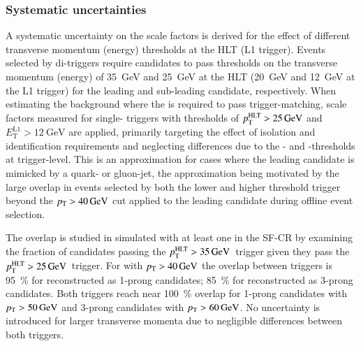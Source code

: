 \subsubsection{Systematic uncertainties}



A systematic uncertainty on the scale factors is derived for the
effect of different \tauhadvis transverse momentum (energy) thresholds
at the HLT (L1 trigger). Events selected by di-\tauhadvis triggers
require \tauhadvis candidates to pass thresholds on the transverse
momentum (energy) of \SI{35}{\GeV} and \SI{25}{\GeV} at the HLT
(\SI{20}{\GeV} and \SI{12}{\GeV} at the L1 trigger) for the leading
and sub-leading \tauhadvis candidate, respectively. When estimating
the \ttbarFakes background where the \faketauhadvis is required to
pass trigger-matching, scale factors measured for single-\tauhadvis
triggers with thresholds of $p_{\text{T}}^{\text{HLT}} > \SI{25}{\ensuremath{\text{GeV}}}$ and
$E_{\text{T}}^{\text{L1}} > \SI{12}{\GeV}$ are applied, primarily
targeting the effect of isolation and identification requirements and
neglecting differences due to the \pT- and \ET-thresholds at
trigger-level. This is an approximation for cases where the leading
\tauhadvis candidate is mimicked by a quark- or gluon-jet, the
approximation being motivated by the large overlap in events selected
by both the lower and higher threshold trigger beyond the
$\pT > \SI{40}{\GeV}$ cut applied to the leading \tauhadvis candidate
during offline event selection.

The overlap is studied in simulated \ttbar with at least one
\faketauhadvis in the SF-CR by examining the fraction of \tauhadvis
candidates passing the $p_{\text{T}}^{\text{HLT}} > \SI{35}{\ensuremath{\text{GeV}}}$~trigger given they
pass the $p_{\text{T}}^{\text{HLT}} > \SI{25}{\ensuremath{\text{GeV}}}$~trigger. For \faketauhadvis with
$\pT > \SI{40}{\GeV}$ the overlap between triggers is
\SI{95}{\percent} for \faketauhadvis reconstructed as 1-prong
candidates; \SI{85}{\percent} for \faketauhadvis reconstructed as
3-prong candidates. %
Both triggers reach near \SI{100}{\percent} overlap for 1-prong
candidates with $p_{\text{T}} > \SI{50}{\ensuremath{\text{GeV}}}$ and 3-prong candidates with
$p_{\text{T}} > \SI{60}{\ensuremath{\text{GeV}}}$. No uncertainty is introduced for
larger transverse momenta due to negligible differences between both
triggers.

